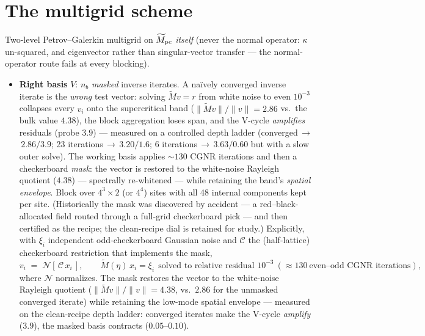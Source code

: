 \documentclass[11pt]{article}
\newcommand{\Mt}{\widetilde{M}}
\begin{document}
\section{The multigrid scheme}
\label{sec:mg}
Two-level Petrov--Galerkin multigrid on $\Mt_{\rm pc}$ \emph{itself}
(never the normal operator: $\kappa$ un-squared, and eigenvector rather
than singular-vector transfer --- the normal-operator route fails at every
blocking).
\begin{itemize}
\item \textbf{Right basis} $V$: $n_b$ \emph{masked} inverse iterates.
A na\"ively converged inverse iterate is the \emph{wrong} test vector:
solving $\Mt v=r$ from white noise to even $10^{-3}$ collapses every
$v_i$ onto the supercritical band
($\|\Mt v\|/\|v\|=2.86$ vs.\ the bulk value $4.38$), the block
aggregation loses span, and the V-cycle \emph{amplifies} residuals
(probe $3.9$) --- measured on a controlled depth ladder
(converged\,$\to$\,$2.86/3.9$; 23 iterations\,$\to$\,$3.20/1.6$; 6
iterations\,$\to$\,$3.63/0.60$ but with a slow outer solve).  The
working basis applies $\sim130$ CGNR iterations and then a checkerboard
\emph{mask}: the vector is restored to the white-noise Rayleigh
quotient ($4.38$) --- spectrally re-whitened --- while retaining the
band's \emph{spatial envelope}.  Block over $4^3\times2$ (or $4^4$)
sites with all 48 internal components kept per site.  (Historically the
mask was discovered by accident --- a red--black-allocated field routed
through a full-grid checkerboard pick --- and then certified as the
recipe; the clean-recipe dial is retained for study.)
Explicitly, with $\xi_i$ independent odd-checkerboard Gaussian noise
and $\mathcal{C}$ the (half-lattice) checkerboard restriction that
implements the mask,
\begin{equation}
v_i \;=\; \mathcal{N}\!\left[\,\mathcal{C}\,x_i\,\right],
\qquad
\Mt(\eta)\, x_i = \xi_i \ \ \text{solved to relative residual }10^{-3}
\ (\approx 130\ \text{even--odd CGNR iterations}),
\end{equation}
where $\mathcal{N}$ normalizes.  The mask restores the vector to the
white-noise Rayleigh quotient
($\|\Mt v\|/\|v\| = 4.38$, vs.\ $2.86$ for the unmasked converged
iterate) while retaining the low-mode spatial envelope --- measured on
the clean-recipe depth ladder: converged iterates make the V-cycle
\emph{amplify} ($3.9$), the masked basis contracts ($0.05$--$0.10$).


\end{itemize}
\end{document}
